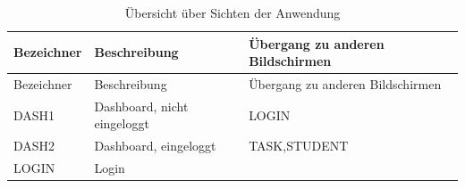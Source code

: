 \documentclass[
  12pt,
  ngerman,
  a4paper,
]{article}
\begin{document}
\begin{longtable}[]{@{}lll@{}}
\caption{Übersicht über Sichten der Anwendung
\label{tbl:screens}}\tabularnewline
\toprule
\begin{minipage}[b]{0.27\columnwidth}\raggedright
Bezeichner\strut
\end{minipage} & \begin{minipage}[b]{0.35\columnwidth}\raggedright
Beschreibung\strut
\end{minipage} & \begin{minipage}[b]{0.28\columnwidth}\raggedright
Übergang zu anderen Bildschirmen\strut
\end{minipage}\tabularnewline
\midrule
\endfirsthead
\toprule
\begin{minipage}[b]{0.27\columnwidth}\raggedright
Bezeichner\strut
\end{minipage} & \begin{minipage}[b]{0.35\columnwidth}\raggedright
Beschreibung\strut
\end{minipage} & \begin{minipage}[b]{0.28\columnwidth}\raggedright
Übergang zu anderen Bildschirmen\strut
\end{minipage}\tabularnewline
\midrule
\endhead
\begin{minipage}[t]{0.27\columnwidth}\raggedright
DASH1\strut
\end{minipage} & \begin{minipage}[t]{0.35\columnwidth}\raggedright
Dashboard, nicht eingeloggt\strut
\end{minipage} & \begin{minipage}[t]{0.28\columnwidth}\raggedright
LOGIN\strut
\end{minipage}\tabularnewline
\begin{minipage}[t]{0.27\columnwidth}\raggedright
DASH2\strut
\end{minipage} & \begin{minipage}[t]{0.35\columnwidth}\raggedright
Dashboard, eingeloggt\strut
\end{minipage} & \begin{minipage}[t]{0.28\columnwidth}\raggedright
TASK,STUDENT\strut
\end{minipage}\tabularnewline
\begin{minipage}[t]{0.27\columnwidth}\raggedright
LOGIN\strut
\end{minipage} & \begin{minipage}[t]{0.35\columnwidth}\raggedright
Login\strut
\end{minipage} & \begin{minipage}[t]{0.28\columnwidth}\raggedright

\end{minipage}
\end{longtable}
\end{document}
